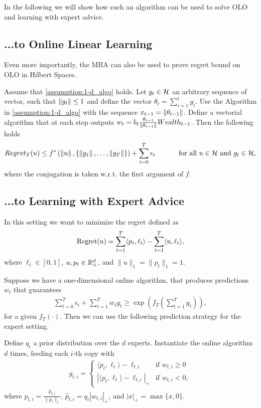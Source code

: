 In the following we will show how such an algorithm can be used to solve \ac{OLO} and learning with expert advice.

\subsection{...to Online Linear Learning}

Even more importantly, the \ac{MBA} can also be used to prove regret bound on \ac{OLO} in Hilbert Spaces.

\begin{theorem}
\label{theo:hilbert_reward}
  Assume that \ref{assumption:1-d_algo} holds.
  Let $g_t \in \mathcal{H}$ an arbitrary sequence of vector, such that $\left\|{g_t}\right\| \leq 1$ and define the vector $\theta_t=\sum_{i=1}^{t} g_i$.
  Use the Algorithm in \ref{assumption:1-d_algo} with the sequence $x_{t-1}= \left\|{\theta_{t-1}}\right\|$.
  Define a vectorial algorithm that at each step outputs $w_t = b_t \frac{\theta_{t-1}}{\left\|{\theta_{t-1}}\right\|} Wealth_{t-1}$. Then the following holds
  \[
    Regret_T(u) \leq f^*\left( \left\|{u}\right\|, \left\{\left\|{g_1}\right\|, \ldots, \left\|{g_T}\right\|\right\}\right)+\sum_{t=0}^T \epsilon_t \quad \quad \quad \textnormal{ for all } u \in \mathcal{H} \textnormal{ and } g_t \in \mathcal{H},
  \]
  where the conjugation is taken w.r.t. the first argument of $f$.
\end{theorem}

\subsection{...to Learning with Expert Advice}

In this setting we want to minimize the regret defined as
\[
\operatorname{Regret}(u) = \sum_{t=1}^T \langle p_t, \ell_t \rangle - \sum_{t=1}^T \langle u, \ell_t \rangle,
\]
where $\ell_t \in [0,1]$, $u, p_t \in \mathbb{R}^d_+$, and $\|u\|_1 = \|p_t\|_1 = 1$.

Suppose we have a one-dimensional online algorithm, that produces
predictions $w_t$ that guarantees
\begin{align}
\label{eq:def_f}
\sum_{t=0}^T \epsilon_t + \sum_{t=1}^T w_t g_t \ge \exp\left(f_T\left(\sum_{t=1}^T g_t\right)\right),
\end{align}
for a given $f_T(\cdot)$. Then we can use the following prediction strategy for the expert setting.

Define $q_i$ a prior distribution over the $d$ experts. Instantiate the online algorithm
$d$ times, feeding each $i$-th copy with
\begin{align}
g_{t,i} = \begin{cases}
\langle p_t, \ell_t\rangle - \ell_{t,i} & \text{if } w_{t,i} \ge 0 \\
|\langle p_t, \ell_t\rangle - \ell_{t,i}|_+ & \text{if } w_{t,i} < 0,
\end{cases}
\end{align}
where $p_{t,i} = \frac{\hat{p}_{t,i}}{\|p_{t}\|_1}$, $\hat{p}_{t,i}=q_i |w_{t,i}|_+$, and $|x|_+=\max\{x,0\}$.

